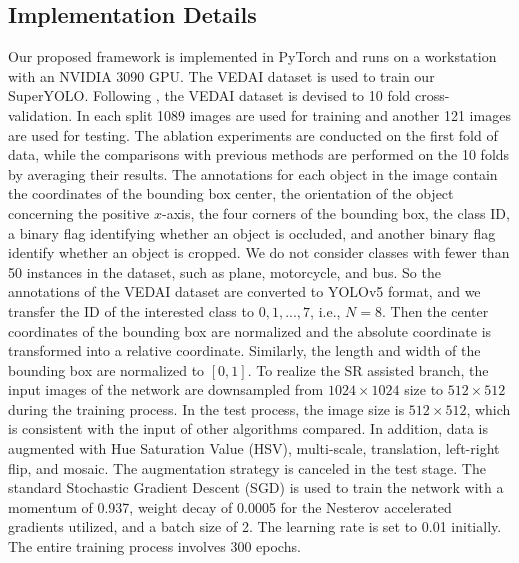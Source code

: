 \subsection{Implementation Details}
Our proposed framework is implemented in PyTorch and runs on a workstation with an NVIDIA 3090 GPU. The VEDAI dataset is used to train our SuperYOLO. Following \cite{9273212}, the VEDAI dataset is devised to 10 fold cross-validation. In each split 1089 images are used for training and another 121 images are used for testing. The ablation experiments are conducted on the first fold of data, while the comparisons with previous methods are performed on the 10 folds by averaging their results. The annotations for each object in the image contain the coordinates of the bounding box center, the orientation of the object concerning the positive $x$-axis, the four corners of the bounding box, the class ID, a binary flag identifying whether an object is occluded, and another binary flag identify whether an object is cropped. We do not consider classes with fewer than 50 instances in the dataset, such as plane, motorcycle, and bus. So the annotations of the VEDAI dataset are converted to YOLOv5 format, and we transfer the ID of the interested class to $0, 1, ..., 7$, i.e., $N=8$. Then the center coordinates of the bounding box are normalized and the absolute coordinate is transformed into a relative coordinate. Similarly, the length and width of the bounding box are normalized to $[0,1]$. To realize the SR assisted branch, the input images of the network are downsampled from $1024 \times 1024$ size to $512 \times 512$ during the training process. In the test process, the image size is $512 \times 512$, which is consistent with the input of other algorithms compared. In addition, data is augmented with Hue Saturation Value (HSV), multi-scale, translation, left-right flip, and mosaic. The augmentation strategy is canceled in the test stage. The standard Stochastic Gradient Descent (SGD) \cite{bottou2010large} is used to train the network with a momentum of 0.937, weight decay of 0.0005 for the Nesterov accelerated gradients utilized, and a batch size of 2. The learning rate is set to 0.01 initially. The entire training process involves 300 epochs. 




